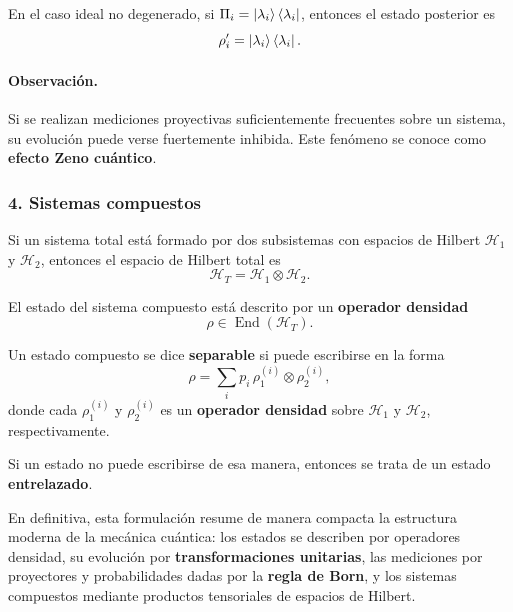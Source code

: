 \documentclass[12pt,a4paper]{article}
\theoremstyle{definition}
\theoremstyle{plain}
\theoremstyle{remark}
\begin{document}
En el caso ideal no degenerado, si $\Pi_i=\ket{\lambda_i}\bra{\lambda_i}$, entonces el estado posterior es
\begin{equation*}
    \rho_i'=\ket{\lambda_i}\bra{\lambda_i}.
\end{equation*}

\paragraph{Observación.}
Si se realizan mediciones proyectivas suficientemente frecuentes sobre un sistema, su evolución puede verse fuertemente inhibida. Este fenómeno se conoce como \textbf{efecto Zeno cuántico}.

\subsubsection*{4. Sistemas compuestos}

Si un sistema total está formado por dos subsistemas con espacios de Hilbert $\mathcal{H}_1$ y $\mathcal{H}_2$, entonces el espacio de Hilbert total es
\begin{equation*}
    \mathcal{H}_T = \mathcal{H}_1 \otimes \mathcal{H}_2.
\end{equation*}

El estado del sistema compuesto está descrito por un \textbf{operador densidad}
\begin{equation*}
    \rho \in \operatorname{End}(\mathcal{H}_T).
\end{equation*}

Un estado compuesto se dice \textbf{separable} si puede escribirse en la forma
\begin{equation*}
    \rho = \sum_i p_i\, \rho_1^{(i)}\otimes \rho_2^{(i)},
\end{equation*}
donde cada $\rho_1^{(i)}$ y $\rho_2^{(i)}$ es un \textbf{operador densidad} sobre $\mathcal{H}_1$ y $\mathcal{H}_2$, respectivamente.

Si un estado no puede escribirse de esa manera, entonces se trata de un estado \textbf{entrelazado}.

En definitiva, esta formulación resume de manera compacta la estructura moderna de la mecánica cuántica: los estados se describen por operadores densidad, su evolución por \textbf{transformaciones unitarias}, las mediciones por proyectores y probabilidades dadas por la \textbf{regla de Born}, y los sistemas compuestos mediante productos tensoriales de espacios de Hilbert.
\end{document}
